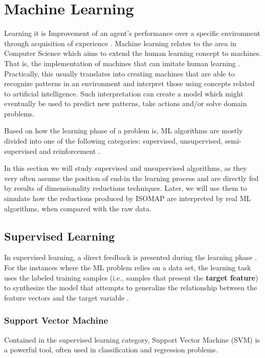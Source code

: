 \clearpage
\section{Machine Learning}
Learning it is Improvement of an agent's performance over a specific environment through acquisition of experience \cite{pat1996}. Machine learning relates to the area in Computer Science which aims to extend the human learning concept to machines. That is, the implementation of machines that can imitate human learning \cite{hot2009}. Practically, this usually translates into creating machines that are able to recognize patterns in an environment and interpret those using concepts related to artificial intelligence. Such interpretation can create a model which might eventually be used to predict new patterns, take actions and/or solve domain problems.

Based on how the learning phase of a problem is, ML algorithms are mostly divided into one of the following categories: supervised, unsupervised, semi-supervised and reinforcement \cite{awa2015}.

In this section we will study supervised and unsupervised algorithms, as they very often assume the position of end-in the learning process and are directly fed by results of dimensionality reductions techniques. Later, we will use them to simulate how the reductions produced by ISOMAP are interpreted by real ML algorithms, when compared with the raw data.

\subsection{Supervised Learning}

In supervised learning, a direct feedback is presented during the learning phase \cite{pat1996}. For the instances where the ML problem relies on a data set, the learning task uses the labeled training samples (i.e., samples that present the \textbf{target feature}) to synthesize the model that attempts to generalize the relationship between the feature vectors and the target variable \cite{awa2015}.

\subsubsection{Support Vector Machine}

Contained in the supervised learning category, Support Vector Machine (SVM) is a powerful tool, often used in classification and regression problems.

